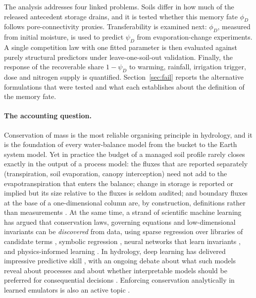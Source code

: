 The analysis addresses four linked problems. Soils differ in how much of the released antecedent storage drains, and it is tested whether this memory fate $\phi_D$ follows pore-connectivity proxies. Transferability is examined next: $\phi_D$, measured from initial moisture, is used to predict $\psi_D$ from evaporation-change experiments. A single competition law with one fitted parameter is then evaluated against purely structural predictors under leave-one-soil-out validation. Finally, the response of the recoverable share $1-\psi_D$ to warming, rainfall, irrigation trigger, dose and nitrogen supply is quantified. Section~\ref{sec:fail} reports the alternative formulations that were tested and what each establishes about the definition of the memory fate.


\paragraph{The accounting question.} Conservation of mass is the most reliable organising principle in hydrology, and it is the foundation of every water-balance model from the bucket to the Earth system model. Yet in practice the budget of a managed soil profile rarely closes exactly in the output of a process model: the fluxes that are reported separately (transpiration, soil evaporation, canopy interception) need not add to the evapotranspiration that enters the balance; change in storage is reported or implied but its size relative to the fluxes is seldom audited; and boundary fluxes at the base of a one-dimensional column are, by construction, definitions rather than measurements \citep{Hillel1998,Refsgaard2004}. At the same time, a strand of scientific machine learning has argued that conservation laws, governing equations and low-dimensional invariants can be \emph{discovered} from data, using sparse regression over libraries of candidate terms \citep{Brunton2016,Champion2019,deSilva2020}, symbolic regression \citep{Schmidt2009,Udrescu2020}, neural networks that learn invariants \citep{Iten2020,Liu2021}, and physics-informed learning \citep{Raissi2019,Karniadakis2021}. In hydrology, deep learning has delivered impressive predictive skill \citep{Kratzert2018,Kratzert2019,Shen2018}, with an ongoing debate about what such models reveal about processes \citep{Nearing2021,Reichstein2019} and about whether interpretable models should be preferred for consequential decisions \citep{Rudin2019}. Enforcing conservation analytically in learned emulators is also an active topic \citep{Beucler2021}.

